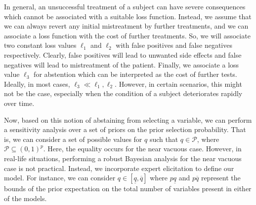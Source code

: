 \documentclass[preprint,12pt]{elsarticle}
\begin{document}
In general, an unsuccessful treatment of a subject can have severe consequences 
which cannot be associated with a suitable loss function. Instead, we
assume that we can always revert any initial mistreatment by further treatments, 
and we can associate a loss function with the cost of further treatments.
So, we will associate two constant loss values $\ell_1$ and $\ell_2$ 
with false positives and false negatives respectively. 
Clearly, false positives will lead to unwanted side effects and
false negatives will lead to mistreatment of the patient. Finally, we associate
a loss value $\ell_3$ for abstention which can be interpreted as the cost of further tests.
Ideally, in most cases, $\ell_3\ll \ell_1,\ell_2$. However, in certain scenarios,
this might not be the case, especially when the condition of a subject deteriorates rapidly
over time.

Now, based on this notion of abstaining from selecting a variable, we can perform
a sensitivity analysis over a set of priors on the prior selection probability.
That is, we can consider a set of possible values for $q$ such that
$q\in\mathcal{P}$, where $\mathcal{P} \subseteq \left(0, 1\right)^{p}$.
Here, the equality occurs for the near vacuous case. However, in real-life
situations, performing a robust Bayesian analysis for the near vacuous case is 
not practical. Instead, we incorporate expert elicitation to define our model.
For instance, we can consider $q\in \left[\underline{q}, \overline{q}\right]$
where $p\underline{q}$ and $p\overline{q}$ represent the bounds of the prior expectation on the
total number of variables present in either of the models.
\end{document}
